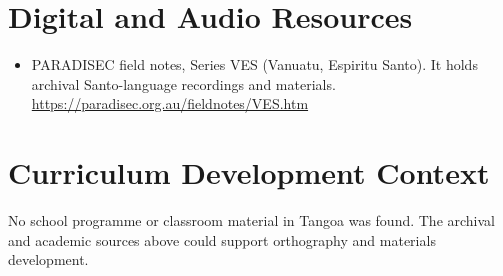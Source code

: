 \documentclass[12pt]{article}
\begin{document}
\section{Digital and Audio Resources}
\begin{itemize}
\item PARADISEC field notes, Series VES (Vanuatu, Espiritu Santo). It holds archival Santo-language recordings and materials. \url{https://paradisec.org.au/fieldnotes/VES.htm}
\end{itemize}
\section{Curriculum Development Context}
No school programme or classroom material in Tangoa was found. The archival and academic sources above could support orthography and materials development.
\end{document}
